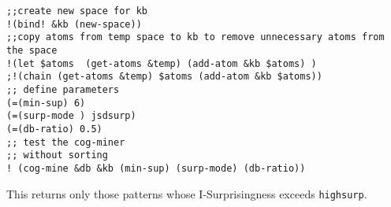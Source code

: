 \documentclass{article}
\begin{document}
\begin{verbatim}
;;create new space for kb
!(bind! &kb (new-space))
;;copy atoms from temp space to kb to remove unnecessary atoms from the space
!(let $atoms  (get-atoms &temp) (add-atom &kb $atoms) )
;!(chain (get-atoms &temp) $atoms (add-atom &kb $atoms))
;; define parameters 
(=(min-sup) 6)
(=(surp-mode ) jsdsurp)
(=(db-ratio) 0.5)
;; test the cog-miner
;; without sorting 
! (cog-mine &db &kb (min-sup) (surp-mode) (db-ratio))
\end{verbatim}





This returns only those patterns whose I-Surprisingness exceeds \texttt{highsurp}.
\end{document}
